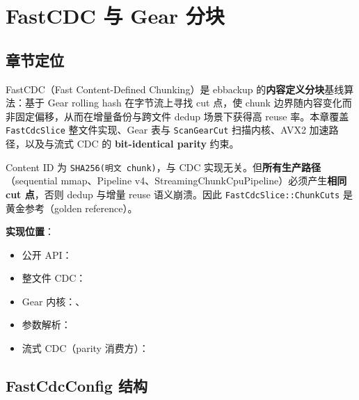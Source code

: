 \chapter{FastCDC 与 Gear 分块}
\label{ch:chunk-fastcdc}

\section{章节定位}

FastCDC（Fast Content-Defined Chunking）是 ebbackup 的\textbf{内容定义分块}基线算法：基于 Gear rolling hash 在字节流上寻找 cut 点，使 chunk 边界随内容变化而非固定偏移，从而在增量备份与跨文件 dedup 场景下获得高 reuse 率。本章覆盖 \texttt{FastCdcSlice} 整文件实现、Gear 表与 \texttt{ScanGearCut} 扫描内核、AVX2 加速路径，以及与流式 CDC 的 \textbf{bit-identical parity} 约束。

\begin{invariantbox}[I-B1 与 CDC 边界]
Content ID 为 \texttt{SHA256(明文 chunk)}，与 CDC 实现无关。但\textbf{所有生产路径}（sequential mmap、Pipeline v4、StreamingChunkCpuPipeline）必须产生\textbf{相同 cut 点}，否则 dedup 与增量 reuse 语义崩溃。因此 \texttt{FastCdcSlice::ChunkCuts} 是黄金参考（golden reference）。
\end{invariantbox}

\textbf{实现位置}：
\begin{itemize}[nosep]
  \item 公开 API：
  \item 整文件 CDC：
  \item Gear 内核：、
  \item 参数解析：
  \item 流式 CDC（parity 消费方）：
\end{itemize}

\section{FastCdcConfig 结构}
\label{sec:fastcdc-config}

